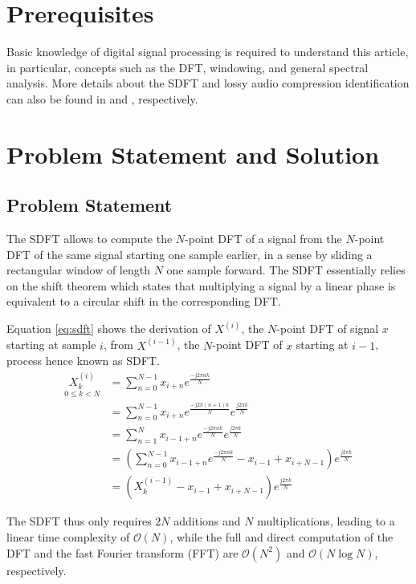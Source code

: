 \documentclass[journal]{IEEEtran}
\begin{document}
\section{Prerequisites}

Basic knowledge of digital signal processing is required to understand this article, in particular, concepts such as the DFT, windowing, and general spectral analysis. More details about the SDFT and lossy audio compression identification can also be found in \cite{jacobsen2003} and \cite{kim2018}, respectively.


\section{Problem Statement and Solution}

\subsection{Problem Statement}

The SDFT allows to compute the $N$-point DFT of a signal from the $N$-point DFT of the same signal starting one sample earlier, in a sense by sliding a rectangular window of length $N$ one sample forward. The SDFT essentially relies on the shift theorem which states that multiplying a signal by a linear phase is equivalent to a circular shift in the corresponding DFT. 

Equation \ref{eq:sdft} shows the derivation of $X^{(i)}$, the $N$-point DFT of signal $x$ starting at sample $i$, from $X^{(i-1)}$, the $N$-point DFT of $x$ starting at $i-1$, process hence known as SDFT.
\begin{equation}
\label{eq:sdft}
\begin{split}
\underset{0 \leq k < N}{X_k^{(i)}} 
& = \sum_{n=0}^{N-1} x_{i+n} e^{\frac{-j 2\pi n k}{N}}\\
& = \sum_{n=0}^{N-1} x_{i+n} e^{\frac{-j 2\pi (n+1) k}{N}} e^{\frac{j 2\pi k}{N}} \\
& = \sum_{n=1}^{N} x_{i-1+n} e^{\frac{-j 2\pi n k}{N}} e^{\frac{j 2\pi k}{N}} \\
& = \left( \sum_{n=0}^{N-1} x_{i-1+n} e^{\frac{-j 2\pi n k}{N}} - x_{i-1} + x_{i+N-1} \right) e^{\frac{j 2\pi k}{N}} \\
& = \left(X_k^{(i-1)} - x_{i-1} + x_{i+N-1} \right) e^{\frac{j 2\pi k}{N}}
\end{split}
\end{equation}

The SDFT thus only requires $2N$ additions and $N$ multiplications, leading to a linear time complexity of $\mathcal{O}(N)$, while the full and direct computation of the DFT and the fast Fourier transform (FFT) are $\mathcal{O}(N^2)$ and $\mathcal{O}(N \log N)$, respectively.
\end{document}
